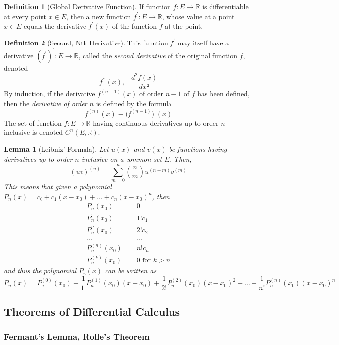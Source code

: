 \documentclass{article}
\newtheorem{lemma}[theorem]{Lemma}
\theoremstyle{remark}
\theoremstyle{definition}
\newtheorem{definition}{Definition}[section]
\begin{document}
\begin{definition}[Global Derivative Function]
If function $f: E \longrightarrow \mathbb{R}$ is differentiable at every point $x \in E$, then a new function $f^\prime: E \longrightarrow \mathbb{R}$, whose value at a point $x \in E$ equals the derivative $f^\prime(x)$ of the function $f$ at the point. 
\end{definition}

\begin{definition}[Second, Nth Derivative]
This function $f^\prime$ may itself have a derivative $(f^\prime)^\prime : E \longrightarrow \mathbb{R}$, called the \textit{second derivative} of the original function $f$, denoted 
\[f^{\prime\prime} (x), \;\;\; \frac{d^2 f(x)}{dx^2}\]
By induction, if the derivative $f^{(n-1)} (x)$ of order $n-1$ of $f$ has been defined, then the \textit{derivative of order $n$} is defined by the formula
\[f^{(n)} (x) \equiv \big(f^{(n-1)}\big)^\prime (x)\]
The set of function $f: E \longrightarrow \mathbb{R}$ having continuous derivatives up to order $n$ inclusive is denoted $C^{n} (E, \mathbb{R})$. 
\end{definition}

\begin{lemma}[Leibniz' Formula]
Let $u(x)$ and $v(x)$ be functions having derivatives up to order $n$ inclusive on a common set $E$. Then, 
\[(uv)^{(n)} = \sum_{m = 0}^n \binom{n}{m} u^{(n-m)} v^{(m)}\]
This means that given a polynomial $P_n (x) = c_0 + c_1 (x - x_0) + \ldots + c_n (x - x_0)^n$, then 
\begin{align*}
    P_n(x_0) & = 0 \\
    P_n^\prime (x_0) & = 1! c_1 \\
    P_n^{\prime\prime} (x_0) & = 2! c_2 \\
    \ldots & = \ldots \\
    P_n^{(n)} (x_0) & = n! c_n \\
    P_n^{(k)} (x_0) & = 0 \text{ for } k > n
\end{align*}
and thus the polynomial $P_n (x)$ can be written as
\[P_n (x) = P_n^{(0)} (x_0) + \frac{1}{1!} P_n^{(1)} (x_0) (x-x_0) + \frac{1}{2!} P_n^{(2)} (x_0) (x-x_0)^2 + \ldots + \frac{1}{n!} P_n^{(n)} (x_0) (x-x_0)^n\]
\end{lemma}

\subsection{Theorems of Differential Calculus}
\subsubsection{Fermant's Lemma, Rolle's Theorem}
\end{document}
